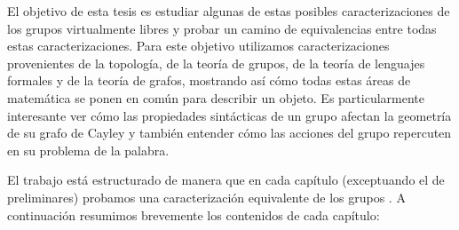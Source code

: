 \documentclass[tesis.tex]{subfiles}
\begin{document}
	El objetivo de esta tesis es estudiar algunas de estas posibles caracterizaciones de los grupos virtualmente libres y probar un camino de equivalencias entre todas estas caracterizaciones.
	Para este objetivo utilizamos caracterizaciones provenientes de la topología, de la teoría de grupos, de la teoría de lenguajes formales y de la teoría de grafos, 
	mostrando así cómo todas estas áreas de matemática se ponen en común para describir un objeto.
	Es particularmente interesante ver cómo las propiedades sintácticas de un grupo afectan la geometría de su grafo de Cayley y  también entender cómo las acciones del grupo repercuten en su problema de la palabra.

	El trabajo está estructurado de manera que en cada capítulo (exceptuando el de 
	preliminares) probamos una caracterización equivalente de los grupos \vls.
	A continuación resumimos brevemente los contenidos de cada capítulo:
\end{document}
